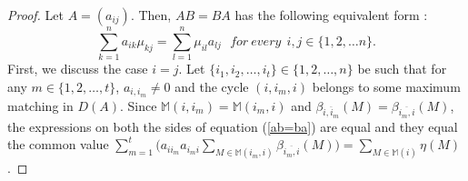 \documentclass[notitlepage,12pt,reqno]{amsart}
\numberwithin{equation}{section}
\begin{document}
\begin{proof}
Let $A=(a_{ij})$. Then, $AB=BA$ has the following equivalent form :
\begin{equation}\label{ab=ba}
\sum _{k=1}^na_{ik}\mu _{kj}=\sum _{l=1}^n\mu _{il} a_{lj}\  \  \  for~every\  \  i,j\in \{1,2,\ldots n\}.
\end{equation}
First, we discuss the case $i=j$. Let $\{i_1,i_2,\ldots ,i_t\}\in \{1,2,\ldots ,n\}$ be such that for any $m\in \{1,2,\ldots ,t\}$, $a_{i,i_m}\neq 0$ and the cycle $(i,i_m,i)$ belongs to some maximum matching in $D(A)$. Since $\mathbb{M}(i,i_m)=\mathbb{M}(i_m,i)$ and $\beta _{\overline{i,i_m}}(M)=\beta _{\overline{i_m,i}}(M)$, the expressions on both the sides of equation (\ref{ab=ba}) are equal and they equal the common value $\sum_{m=1}^t\big (a_{ii_m}a_{i_mi}\sum _{M\in \mathbb{M}(i_m,i)}\beta _{\overline{i_m,i}}(M)\big)=\sum _{M\in \mathbb{M}(i)}\eta (M)$.


\end{proof}
\end{document}

